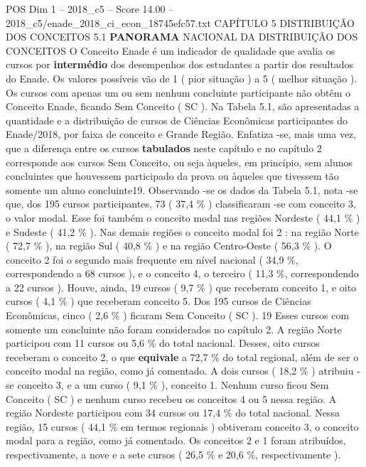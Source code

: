 \begin{textsample}{POS Dim 1 – 2018\_c5 – Score 14.00 – 2018\_c5/enade\_2018\_ci\_econ\_18745efc57.txt}  \label{ex:f1_pos_070}
CAPÍTULO 5 DISTRIBUIÇÃO DOS CONCEITOS 5.1 \textbf{PANORAMA} NACIONAL DA DISTRIBUIÇÃO DOS CONCEITOS O Conceito Enade é um indicador de qualidade que avalia os cursos por \textbf{intermédio} dos desempenhos dos estudantes a partir dos resultados do Enade.
Os valores possíveis vão de 1 ( pior situação ) a 5 ( melhor situação ).
Os cursos com apenas um ou sem nenhum concluinte participante não obtêm o Conceito Enade, ficando Sem Conceito ( SC ).
Na Tabela 5.1, são apresentadas a quantidade e a distribuição de cursos de Ciências Econômicas participantes do Enade/2018, por faixa de conceito e Grande Região.
Enfatiza -se, mais uma vez, que a diferença entre os cursos \textbf{tabulados} neste capítulo e no capítulo 2 corresponde aos cursos Sem Conceito, ou seja àqueles, em princípio, sem alunos concluintes que houvessem participado da prova ou àqueles que tivessem tão somente um aluno concluinte19.
Observando -se os dados da Tabela 5.1, nota -se que, dos 195 cursos participantes, 73 ( 37,4 \% ) classificaram -se com conceito 3, o valor modal.
Esse foi também o conceito modal nas regiões Nordeste ( 44,1 \% ) e Sudeste ( 41,2 \% ).
Nas demais regiões o conceito modal foi 2 : na região Norte ( 72,7 \% ), na região Sul ( 40,8 \% ) e na região Centro-Oeste ( 56,3 \% ).
O conceito 2 foi o segundo mais frequente em nível nacional ( 34,9 \%, correspondendo a 68 cursos ), e o conceito 4, o terceiro ( 11,3 \%, correspondendo a 22 cursos ).
Houve, ainda, 19 cursos ( 9,7 \% ) que receberam conceito 1, e oito cursos ( 4,1 \% ) que receberam conceito 5.
Dos 195 cursos de Ciências Econômicas, cinco ( 2,6 \% ) ficaram Sem Conceito ( SC ). 19 Esses cursos com somente um concluinte não foram considerados no capítulo 2.
A região Norte participou com 11 cursos ou 5,6 \% do total nacional.
Desses, oito cursos receberam o conceito 2, o que \textbf{equivale} a 72,7 \% do total regional, além de ser o conceito modal na região, como já comentado.
A dois cursos ( 18,2 \% ) atribuiu -se conceito 3, e a um curso ( 9,1 \% ), conceito 1.
Nenhum curso ficou Sem Conceito ( SC ) e nenhum curso recebeu os conceitos 4 ou 5 nessa região.
A região Nordeste participou com 34 cursos ou 17,4 \% do total nacional.
Nessa região, 15 cursos ( 44,1 \% em termos regionais ) obtiveram conceito 3, o conceito modal para a região, como já comentado.
Os conceitos 2 e 1 foram atribuídos, respectivamente, a nove e a sete cursos ( 26,5 \% e 20,6 \%, respectivamente ).

\end{textsample}
